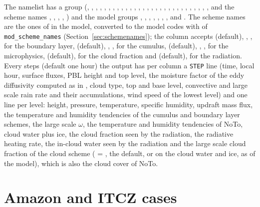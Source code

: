 The namelist has a  group (,
, , , ,
, , , ,
, , , ,
, , , ,
, ,
, , , ,
, , , ,
, ,  and the scheme names
, , ,
, ) and the model groups
, , ,
, , ,
,  and . The scheme
names are the ones of  in the model, converted to the
model codes with  of \verb=mod_scheme_names=
(Section~\ref{sec:schemenames}); the column accepts 
(default), , ,  for the boundary
layer,  (default), , ,
 for the cumulus,  (default), ,
,  for the microphysics, 
(default),  for the cloud fraction and 
(default),  for the radiation. Every  steps (default one hour)
the output has per column a \verb=STEP= line (time, local hour, surface
fluxes, PBL height and top level, the moisture factor of the eddy
diffusivity  computed as in , cloud type, top
and base level, convective and large scale rain rate and their
accumulations, wind speed of the lowest level) and one line per level:
height, pressure, temperature, specific humidity, updraft mass flux, the
temperature and humidity tendencies of the cumulus and boundary layer
schemes, the large scale $\omega$, the temperature and humidity
tendencies of NoTo, cloud water plus ice, the cloud fraction seen by the
radiation, the radiative heating rate, the in-cloud water seen by the
radiation and the large scale cloud fraction of the cloud scheme
( = , the default, or
 on the cloud water and ice, as  of the
model), which is also the cloud
cover of NoTo.

\section{Amazon and ITCZ cases}

